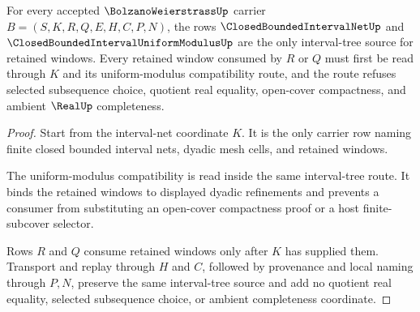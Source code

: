 \begin{theorem}
\label{thm:bolzano-weierstrass-interval-net-obligation}
For every accepted $\BolzanoWeierstrassUp$ carrier $B=(S,K,R,Q,E,H,C,P,N)$, the rows $\ClosedBoundedIntervalNetUp$ and $\ClosedBoundedIntervalUniformModulusUp$ are the only interval-tree source for retained windows. Every retained window consumed by $R$ or $Q$ must first be read through $K$ and its uniform-modulus compatibility route, and the route refuses selected subsequence choice, quotient real equality, open-cover compactness, and ambient $\RealUp$ completeness.
\end{theorem}
\begin{proof}
Start from the interval-net coordinate $K$. It is the only carrier row naming finite closed bounded interval nets, dyadic mesh cells, and retained windows.

The uniform-modulus compatibility is read inside the same interval-tree route. It binds the retained windows to displayed dyadic refinements and prevents a consumer from substituting an open-cover compactness proof or a host finite-subcover selector.

Rows $R$ and $Q$ consume retained windows only after $K$ has supplied them. Transport and replay through $H$ and $C$, followed by provenance and local naming through $P,N$, preserve the same interval-tree source and add no quotient real equality, selected subsequence choice, or ambient completeness coordinate.
\end{proof}

